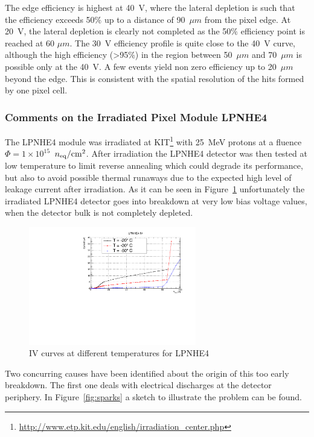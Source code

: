 The edge efficiency is highest at 40~V, where the lateral depletion is such that the efficiency exceeds 50$\%$ up to a distance of 90~$\mu m$ from the pixel edge. At 20~V, the lateral depletion is clearly not completed as the 50$\%$ efficiency point is reached at 60 $\mu m$. The 30~V efficiency profile is quite close to the 40~V curve, although the high efficiency (>95\%) in the region between 50~$\mu m$ and 70~$\mu m$ is possible only at the 40~V. A few events yield non zero efficiency up to 20~$\mu m$ beyond the edge. This is consistent with the spatial resolution of the hits formed by one pixel cell.

\subsubsection{Comments on the Irradiated  Pixel Module LPNHE4}



The LPNHE4 module was irradiated  at KIT\footnote{\url{http://www.etp.kit.edu/english/irradiation_center.php}}
 with 25~MeV protons at a fluence  $\Phi=1\times10^{15}$~$n_{\rm eq}/{\rm cm}^{2}$. 
After irradiation the LPNHE4 detector was then tested at low temperature 
to limit reverse annealing which could degrade its performance, but also 
to avoid possible thermal runaways due to the expected high level of 
leakage current after irradiation. 
As it can be seen in Figure~\ref{fig:LPNHE4_IV} unfortunately the irradiated LPNHE4 detector goes into breakdown at very low bias voltage 
values, when the detector bulk is not completely depleted.

\begin{figure}[!htb]
\centering
\includegraphics[width=0.65\textwidth]{LPNHE4_IV.pdf}
\caption{\label{fig:LPNHE4_IV}IV curves at different temperatures for LPNHE4}
\end{figure}


Two concurring causes have been identified about the origin of this too early 
breakdown. The first one deals with  electrical discharges at the 
detector periphery. In Figure~\ref{fig:sparks} a sketch to illustrate the problem can be found. 



